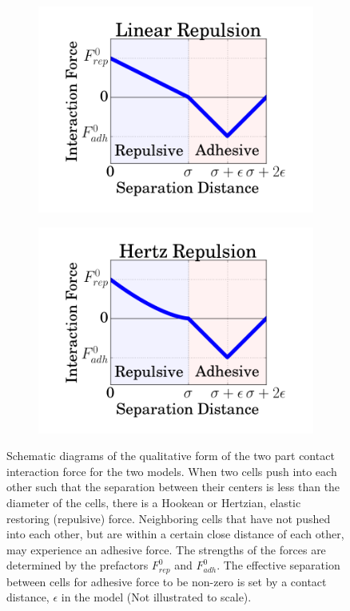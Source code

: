 \documentclass[aps,prb,twocolumn,groupedaddress,nofootinbib,floatfix]{revtex4}
\begin{document}
\begin{figure}
  \begin{subfigure}{\columnwidth}
    \includegraphics[width=1.0\columnwidth]{images/interaction.png}
  \end{subfigure}
  \begin{subfigure}{\columnwidth}
    \includegraphics[width=1.0\columnwidth]{images/hertz.png}
  \end{subfigure}
  \caption[capsuleECM]{Schematic diagrams of the qualitative form of the two part contact interaction force for the two models. When two cells push into each other such that the separation between their centers is less than the diameter of the cells, there is a Hookean or Hertzian, elastic restoring (repulsive) force. Neighboring cells that have not pushed into each other, but are within a certain close distance of each other, may experience an adhesive force. The strengths of the forces are determined by the prefactors $F_{rep}^0$ and $F_{adh}^0$. The effective separation between cells for adhesive force to be non-zero is set by a contact distance, $\epsilon$  in the model (Not illustrated to scale).}
  \label{fig:interaction}
\end{figure}
\end{document}
